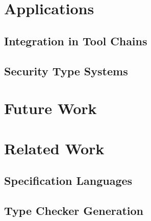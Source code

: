 \documentclass[a4paper,twoside]{report}
\numberwithin{definition}{chapter}
\begin{document}
\chapter{Applications}
\section{Integration in Tool Chains}
\section{Security Type Systems}

\chapter{Future Work}

\chapter{Related Work}
\section{Specification Languages}
\section{Type Checker Generation}


\end{document}
